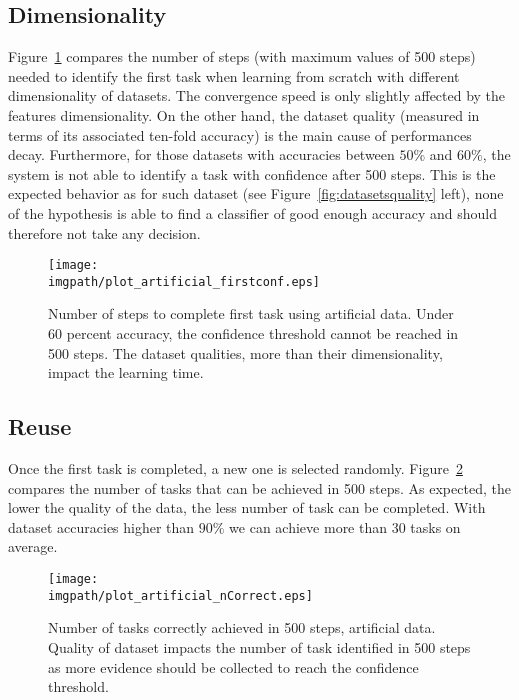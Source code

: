 \subsection{Dimensionality}

Figure~\ref{fig:firstArtificial} compares the number of steps (with maximum values of 500 steps) needed to identify the first task when learning from scratch with different dimensionality of datasets. The convergence speed is only slightly affected by the features dimensionality. On the other hand, the dataset quality (measured in terms of its associated ten-fold accuracy) is the main cause of performances decay. Furthermore, for those datasets with accuracies between $50\%$ and $60\%$, the system is not able to identify a task with confidence after 500 steps. This is the expected behavior as for such dataset (see Figure~\ref{fig:datasetsquality} left), none of the hypothesis is able to find a classifier of good enough accuracy and should therefore not take any decision.

\begin{figure}[!htbp]
  \centering
      \texttt{[image: \\imgpath/plot\_artificial\_firstconf.eps]}
      \caption{Number of steps to complete first task using artificial data. Under 60 percent accuracy, the confidence threshold cannot be reached in 500 steps. The dataset qualities, more than their dimensionality, impact the learning time.}
      \label{fig:firstArtificial}
\end{figure} 

\subsection{Reuse}

Once the first task is completed, a new one is selected randomly. Figure~\ref{fig:nCorrectArtificial} compares the number of tasks that can be achieved in 500 steps. As expected, the lower the quality of the data, the less number of task can be completed. With dataset accuracies higher than $90\%$ we can achieve more than 30 tasks on average.

\begin{figure}[!htbp]
    \centering
    \texttt{[image: \\imgpath/plot\_artificial\_nCorrect.eps]}
    \caption{Number of tasks correctly achieved in 500 steps, artificial data. Quality of dataset impacts the number of task identified in 500 steps as more evidence should be collected to reach the confidence threshold.}
    \label{fig:nCorrectArtificial}
\end{figure} 

